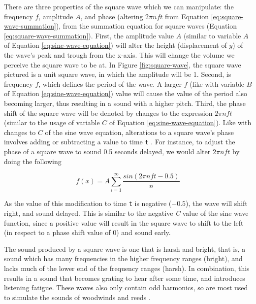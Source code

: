 There are three properties of the square wave which we can manipulate: the frequency $f$, amplitude $A$, and phase (altering $2\pi nft$ from Equation \ref{eq:square-wave-summation}), from the summation equation for square waves (Equation \ref{eq:square-wave-summation}). First, the amplitude value $A$ (similar to variable $A$ of Equation \ref{eq:sine-wave-equation}) will alter the height (displacement of $y$) of the wave's peak and trough from the x-axis. This will change the volume we perceive the square wave to be at. In Figure \ref{fig:square-wave}, the square wave pictured is a unit square wave, in which the amplitude will be 1. Second, is frequency $f$, which defines the period of the wave. A larger $f$ (like with variable $B$ of Equation \ref{eq:sine-wave-equation}) value will cause the value of the period also becoming larger, thus resulting in a sound with a higher pitch. Third, the phase shift of the square wave will be denoted by changes to the expression $2\pi nft$ (similar to the usage of variable $C$ of Equation \ref{eq:sine-wave-equation}). Like with changes to $C$ of the sine wave equation, alterations to a square wave's phase involves adding or subtracting a value to time \texttt{t} \cite{Wellesley_College_Staff_2021}. For instance, to adjust the phase of a square wave to sound 0.5 seconds delayed, we would alter $2\pi nft$ by doing the following

\begin{equation*}
    f(x) = A \sum_{i=1}^{\infty} \frac{sin(2\pi nft - 0.5)}{n}
\end{equation*}

As the value of this modification to time \texttt{t} is negative ($-0.5$), the wave will shift right, and sound delayed. This is similar to the negative \textit{C} value of the sine wave function, since a positive value will result in the square wave to shift to the left (in respect to a phase shift value of 0) and sound early.

The sound produced by a square wave is one that is harsh and bright, that is, a sound which has many frequencies in the higher frequency ranges (bright), and lacks much of the lower end of the frequency ranges (harsh). In combination, this results in a sound that becomes grating to hear after some time, and introduces listening fatigue. These waves also only contain odd harmonics, so are most used to simulate the sounds of woodwinds and reeds \cite{Dowsett_2016}. 


